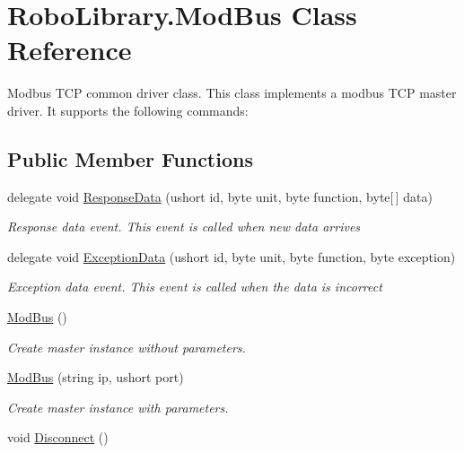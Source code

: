 \hypertarget{class_robo_library_1_1_mod_bus}{}\section{Robo\+Library.\+Mod\+Bus Class Reference}
\label{class_robo_library_1_1_mod_bus}


Modbus T\+CP common driver class. This class implements a modbus T\+CP master driver. It supports the following commands\+:  


\subsection*{Public Member Functions}
\begin{DoxyCompactItemize}
\item 
delegate void \hyperlink{class_robo_library_1_1_mod_bus_a497317cafb760023aef4af60fba95c0b}{Response\+Data} (ushort id, byte unit, byte function, byte\mbox{[}$\,$\mbox{]} data)
\begin{DoxyCompactList}\small\item\em Response data event. This event is called when new data arrives\end{DoxyCompactList}\item 
delegate void \hyperlink{class_robo_library_1_1_mod_bus_ac78341a28ded6af9cc33c594315e7c06}{Exception\+Data} (ushort id, byte unit, byte function, byte exception)
\begin{DoxyCompactList}\small\item\em Exception data event. This event is called when the data is incorrect\end{DoxyCompactList}\item 
\hyperlink{class_robo_library_1_1_mod_bus_a060babdf6c052c1b86a160d8ddf68ef1}{Mod\+Bus} ()
\begin{DoxyCompactList}\small\item\em Create master instance without parameters.\end{DoxyCompactList}\item 
\hyperlink{class_robo_library_1_1_mod_bus_a9d7338590ea8f3a27978f7a8e6eebe92}{Mod\+Bus} (string ip, ushort port)
\begin{DoxyCompactList}\small\item\em Create master instance with parameters.\end{DoxyCompactList}\item 
void \hyperlink{class_robo_library_1_1_mod_bus_ac84e8e0281a5b3089742e860cfdd25e5}{Disconnect} ()

\end{DoxyCompactItemize}

